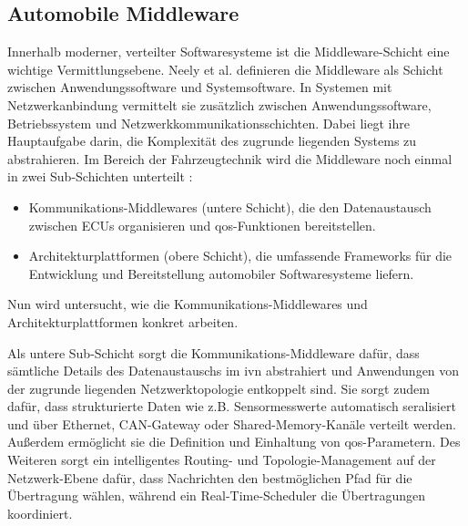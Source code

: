 \subsection{Automobile Middleware}
\label{subsect:middle}
Innerhalb moderner, verteilter Softwaresysteme ist die Middleware-Schicht eine wichtige Vermittlungsebene. Neely et al. \cite{neely2006adaptive} definieren die Middleware als Schicht zwischen Anwendungssoftware und Systemsoftware. In Systemen mit Netzwerkanbindung vermittelt sie zusätzlich zwischen Anwendungssoftware, Betriebssystem und Netzwerkkommunikationsschichten. Dabei liegt ihre Hauptaufgabe darin, die Komplexität des zugrunde liegenden Systems zu abstrahieren. Im Bereich der Fahrzeugtechnik wird die Middleware noch einmal in zwei Sub-Schichten unterteilt \cite{kluner2024moderna}:
\begin{itemize}
  \item Kommunikations-Middlewares (untere Schicht), die den Datenaustausch zwischen ECUs organisieren und \gls{qos}-Funktionen bereitstellen.
  \item Architekturplattformen (obere Schicht), die umfassende Frameworks für die Entwicklung und Bereitstellung automobiler Softwaresysteme liefern.
\end{itemize}
Nun wird untersucht, wie die Kommunikations-Middlewares und Architekturplattformen konkret arbeiten.

Als untere Sub-Schicht sorgt die Kommunikations-Middleware dafür, dass sämtliche Details des Datenaustauschs im \gls{ivn} abstrahiert und Anwendungen von der zugrunde liegenden Netzwerktopologie entkoppelt sind. Sie sorgt zudem dafür, dass strukturierte Daten wie z.B. Sensormesswerte automatisch seralisiert und über Ethernet, CAN-Gateway oder Shared-Memory-Kanäle verteilt werden. Außerdem ermöglicht sie die Definition und Einhaltung von \gls{qos}-Parametern. Des Weiteren sorgt ein intelligentes Routing- und Topologie-Management auf der Netzwerk-Ebene dafür, dass Nachrichten den bestmöglichen Pfad für die Übertragung wählen, während ein Real-Time-Scheduler die Übertragungen koordiniert.


